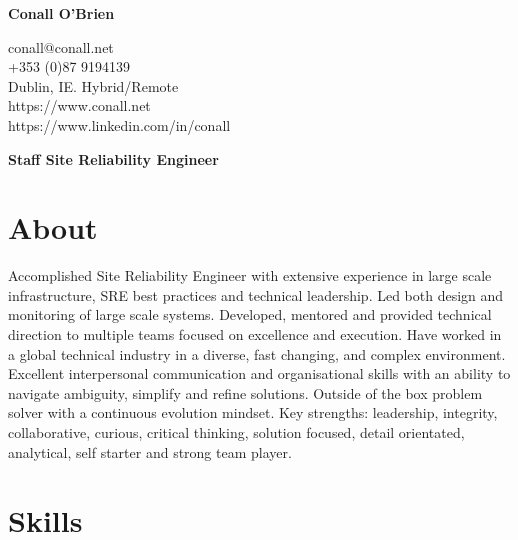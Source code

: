 \documentclass[a4paper, 10pt] {article}
\begin{document}
\begingroup
  \centering
  \LARGE \textbf{Conall O'Brien}\\[1.5em]
\endgroup


\begingroup
  \centering
  \small
      conall@conall.net \\
      +353 (0)87 9194139 \\
      Dublin, IE. Hybrid/Remote \\
      https://www.conall.net \\
      https://www.linkedin.com/in/conall \\
      \vspace{5mm} %
  \normalsize
\endgroup

\begingroup
  \centering
  \large \textbf{Staff Site Reliability Engineer}\\[1em]
\endgroup

\section*{About}

Accomplished Site Reliability Engineer with extensive experience in
large scale infrastructure, SRE best practices and technical leadership.
Led both design and monitoring of large scale systems. Developed, mentored
and provided technical direction to multiple teams focused on excellence
and execution. Have worked in a global technical industry in a diverse,
fast changing, and complex environment. Excellent interpersonal
communication and organisational skills with an ability to navigate
ambiguity, simplify and refine solutions. Outside of the box problem
solver with a continuous evolution mindset. Key strengths: leadership,
integrity, collaborative, curious, critical thinking, solution focused,
detail orientated, analytical, self starter and strong team player.

\section*{Skills}
\end{document}

